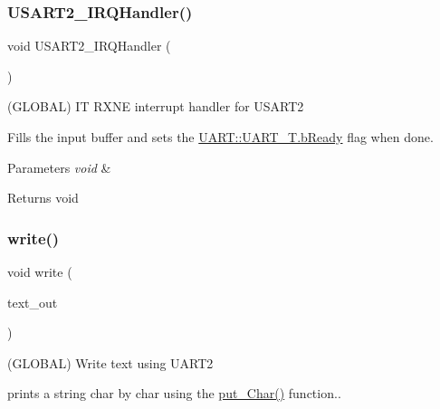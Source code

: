 \subsubsection{\texorpdfstring{U\+S\+A\+R\+T2\+\_\+\+I\+R\+Q\+Handler()}{USART2\_IRQHandler()}}
{\footnotesize\ttfamily void U\+S\+A\+R\+T2\+\_\+\+I\+R\+Q\+Handler (\begin{DoxyParamCaption}\item[{void}]{ }\end{DoxyParamCaption})}



(G\+L\+O\+B\+AL) IT R\+X\+NE interrupt handler for U\+S\+A\+R\+T2 

Fills the input buffer and sets the \mbox{\hyperlink{struct_u_a_r_t_1_1_u_a_r_t___t_a8f2d43e22185dc1f3f4e5fcaacd0d559}{U\+A\+R\+T\+::\+U\+A\+R\+T\+\_\+\+T.\+b\+Ready}} flag when done.


\begin{DoxyParams}{Parameters}
{\em void} & \\
\hline
\end{DoxyParams}
\begin{DoxyReturn}{Returns}
void 
\end{DoxyReturn}
\mbox{\label{namespace_u_a_r_t_a20b32a5769a95ed363726431c01702e9}} 
\subsubsection{\texorpdfstring{write()}{write()}}
{\footnotesize\ttfamily void write (\begin{DoxyParamCaption}\item[{char $\ast$}]{text\+\_\+out }\end{DoxyParamCaption})}



(G\+L\+O\+B\+AL) Write text using U\+A\+R\+T2 

prints a string char by char using the \mbox{\hyperlink{namespace_u_a_r_t_ae9667edee69ced0a5f4ada356f4a4fa1}{put\+\_\+\+Char()}} function..


